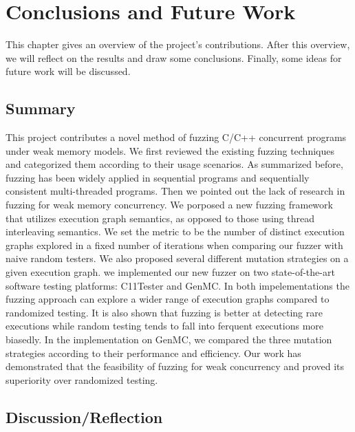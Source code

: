\chapter{\label{cha:conclusion}Conclusions and Future
  Work}

This chapter gives an overview of the project's contributions. After
this overview, we will reflect on the results and draw some
conclusions. Finally, some ideas for future work will be discussed.

\section{Summary}

This project contributes a novel method of fuzzing C/C++ concurrent programs under weak memory models. We first reviewed the existing fuzzing techniques and categorized them according to their usage scenarios. As summarized before, fuzzing has been widely applied in sequential programs and sequentially consistent multi-threaded programs. Then we pointed out the lack of research in fuzzing for weak memory concurrency. We porposed a new fuzzing framework that utilizes execution graph semantics, as opposed to those using thread interleaving semantics. We set the metric to be the number of distinct execution graphs explored in a fixed number of iterations when comparing our fuzzer with naive random testers. We also proposed several different mutation strategies on a given execution graph. we implemented our new fuzzer on two state-of-the-art software testing platforms: C11Tester and GenMC. In both impelementations the fuzzing approach can explore a wider range of execution graphs compared to randomized testing. It is also shown that fuzzing is better at detecting rare executions while random testing tends to fall into ferquent executions more biasedly. In the implementation on GenMC, we compared the three mutation strategies according to their performance and efficiency. Our work has demonstrated that the feasibility of fuzzing for weak concurrency and proved its superiority over randomized testing.



\section{Discussion/Reflection}

